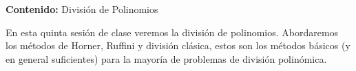{\Large
    \textbf{Contenido:} División de Polinomios
}

En esta quinta sesión de clase veremos la división de polinomios. Abordaremos los métodos de Horner, Ruffini y división clásica,
estos son los métodos básicos (y en general suficientes) para la mayoría de problemas de división polinómica.
